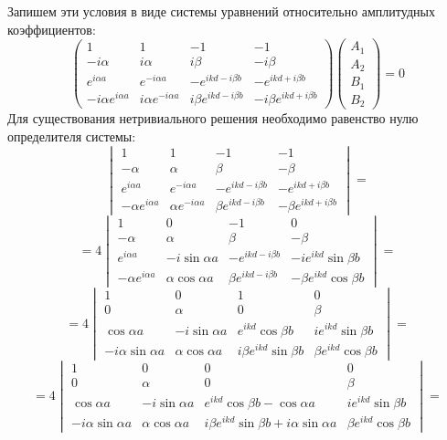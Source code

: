 Запишем эти условия в виде системы уравнений относительно амплитудных коэффициентов:
\[
    \begin{pmatrix}
        1 & 1 & -1 & -1 \\
        -i\alpha & i\alpha & i\beta & -i\beta \\
        e^{i\alpha a} & e^{-i\alpha a}  & -e^{ikd-i\beta b}  & -e^{ikd+i\beta b} \\
        -i\alpha e^{i\alpha a} & i\alpha e^{-i\alpha a}  & i\beta e^{ikd-i\beta b}  &
        -i\beta e^{ikd+i\beta b}
    \end{pmatrix}
    \begin{pmatrix}
        A_1\\
        A_2\\
        B_1\\
        B_2
    \end{pmatrix}
    =
    0
\]
Для существования нетривиального решения необходимо равенство нулю определителя
системы:
\[
    \begin{vmatrix}
        1 & 1 & -1 & -1 \\
        -\alpha & \alpha & \beta & -\beta \\
        e^{i\alpha a} & e^{-i\alpha a}  & -e^{ikd-i\beta b}  & -e^{ikd+i\beta b} \\
        -\alpha e^{i\alpha a} & \alpha e^{-i\alpha a}  & \beta e^{ikd-i\beta b}  &
        -\beta e^{ikd+i\beta b}
    \end{vmatrix}
    =
\]
\[
    =4
    \begin{vmatrix}
        1 & 0 & -1 & 0 \\
        -\alpha & \alpha & \beta & -\beta \\
    e^{i\alpha a} & -i\sin \alpha a  & -e^{ikd-i\beta b}  & -ie^{ikd}\sin\beta b \\
        -\alpha e^{i\alpha a} & \alpha \cos\alpha a & \beta e^{ikd-i\beta b}  &
        -\beta e^{ikd}\cos\beta b
    \end{vmatrix}
    =
\]
\[
    =4
    \begin{vmatrix}
        1 & 0 & 1 & 0 \\
        0 & \alpha & 0 & \beta \\
    \cos\alpha a & -i\sin \alpha a  & e^{ikd}\cos \beta b  & ie^{ikd}\sin\beta b \\
        -i\alpha \sin\alpha a & \alpha \cos\alpha a & i \beta e^{ikd} \sin{\beta b}  &
        \beta e^{ikd}\cos\beta b
    \end{vmatrix}
    =
\]
\[
    =4
    \begin{vmatrix}
        1 & 0 & 0 & 0 \\
        0 & \alpha & 0 & \beta \\
    \cos\alpha a & -i\sin \alpha a  & e^{ikd}\cos \beta b - \cos\alpha a  & ie^{ikd}\sin\beta b \\
        -i\alpha \sin\alpha a & \alpha \cos\alpha a & i \beta e^{ikd} \sin{\beta
    b} + i\alpha\sin\alpha a  &
        \beta e^{ikd}\cos\beta b
    \end{vmatrix}
    =
\]

